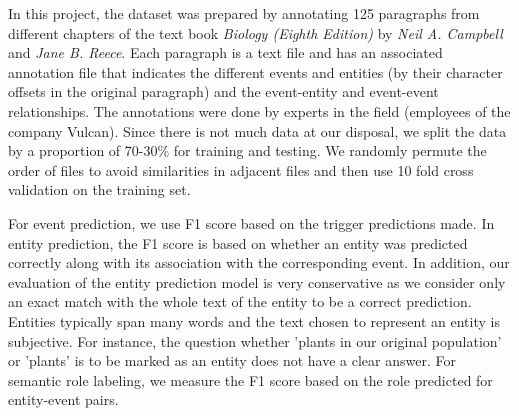 In this project, the dataset was prepared by annotating 125 paragraphs from different chapters of the text book {\em Biology (Eighth Edition)} by {\em Neil A. Campbell} and {\em Jane B. Reece}. Each paragraph is a text file and has an associated annotation file that indicates the different events and entities (by their character offsets in the original paragraph) and the event-entity and event-event relationships. The annotations were done by experts in the field (employees of the company Vulcan). Since there is not much data at our disposal, we split the data by a proportion of 70-30\% for training and testing. We randomly permute the order of files to avoid similarities in adjacent files and then use 10 fold cross validation on the training set. 

For event prediction, we use F1 score based on the trigger predictions made. In entity prediction, the F1 score is based on whether an entity was predicted correctly along with its association with the corresponding event. In addition, our evaluation of the entity prediction model is very conservative as we consider only an exact match with the whole text of the entity to be a correct prediction. Entities typically span many words and the text chosen to represent an entity is subjective. For instance, the question whether 'plants in our original population' or 'plants' is to be marked as an entity does not have a clear answer. For semantic role labeling, we measure the F1 score based on the role predicted for entity-event pairs.